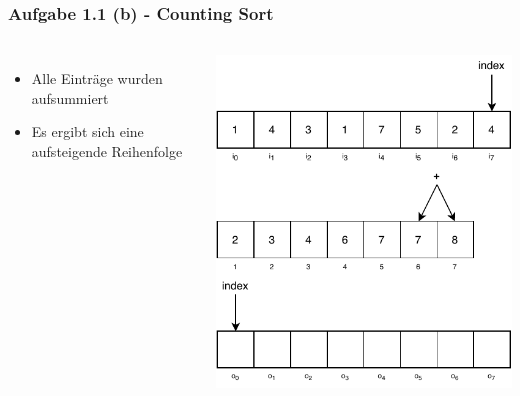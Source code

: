 \documentclass[aspectratio=169]{beamer}
\begin{document}
\begin{frame}
	\frametitle{Aufgabe 1.1 (b) - Counting Sort}
	\begin{columns}[c] %
	
	\begin{itemize}
		\item Alle Einträge wurden aufsummiert
		\item Es ergibt sich eine aufsteigende Reihenfolge
	\end{itemize}
	
	\includegraphics[scale=.7]{cs9.pdf}
	
	\end{columns}
	\end{frame}
\end{document}
